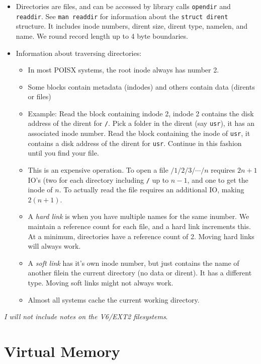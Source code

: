 \documentclass[12pt]{article}
\begin{document}
\begin{itemize}
	\item Directories are files, and can be accessed by library calls \texttt{opendir} and \texttt{readdir}. See \texttt{man readdir} for information about the \texttt{struct dirent} structure. It includes inode numbers, dirent size, dirent type, namelen, and name. We round record length up to 4 byte boundaries. 
	\item Information about traversing directories:
		\begin{itemize}
			\item In most POISX systems, the root inode always has number 2. 
			\item Some blocks contain metadata (indodes) and others contain data (dirents or files)
			\item Example: Read the block containing indode 2, indode 2 contains the disk address of the dirent for \texttt{/}. Pick a folder in the dirent (say \texttt{usr}), it has an associated inode number. Read the block containing the inode of \texttt{usr}, it contains a disk address of the dirent for \texttt{usr}. Continue in this fashion until you find your file. 
			\item This is an expensive operation. To open a file $/1/2/3/\cdots/n$ requires $2n+1$ IO's (two for each directory including \texttt{/} up to $n-1$, and one to get the inode of $n$. To actually read the file requires an additional IO, making $2(n+1)$.
			\item A \textit{hard link} is when you have multiple names for the same inumber. We maintain a reference count for each file, and a hard link increments this. At a minimum, directories have a reference count of 2. Moving hard links will always work.
			\item A \textit{soft link} has it's own inode number, but just contains the name of another filein the current directory (no data or dirent). It has a different type. Moving soft links might not always work.
			\item Almost all systems cache the current working directory. 
		\end{itemize}
\end{itemize}
\textit{I will not include notes on the V6/EXT2 filesystems}.
\newpage

\section{Virtual Memory}
\end{document}
